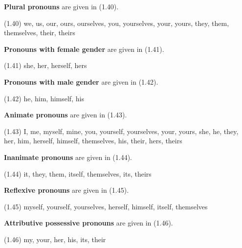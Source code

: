 \documentclass{article}
\begin{document}
\textbf{Plural pronouns} are given in (1.40).

\begin{enumerate*}
\item[(1.40)] we, us, our, ours, ourselves, you, yourselves,
your, yours, they, them, themselves, their, theirs
\end{enumerate*}

\textbf{Pronouns with female gender} are given in (1.41).

\begin{enumerate*}
\item[(1.41)] she, her, herself, hers
\end{enumerate*}

\textbf{Pronouns with male gender} are given in (1.42).

\begin{enumerate*}
\item[(1.42)] he, him, himself, his
\end{enumerate*}

\textbf{Animate pronouns} are given in (1.43).

\begin{enumerate*}
\item[(1.43)] I, me, myself, mine, you, yourself, yourselves,
your, yours, she, he, they, her, him, herself, himself,
themselves, his, their, hers, theirs
\end{enumerate*}

\textbf{Inanimate pronouns} are given in (1.44).

\begin{enumerate*}
\item[(1.44)] it, they, them, itself, themselves, its, theirs
\end{enumerate*}

\textbf{Reflexive pronouns} are given in (1.45).

\begin{enumerate*}
\item[(1.45)] myself, yourself, yourselves, herself, himself,
itself, themselves
\end{enumerate*}

\textbf{Attributive possessive pronouns} are given in (1.46).

\begin{enumerate*}
\item[(1.46)] my, your, her, his, its, their
\end{enumerate*}
\end{document}
